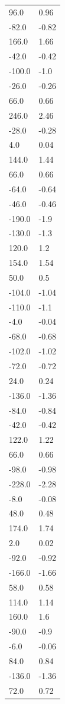 \begin{longtable}{ll}
96.0 & 0.96 \\
-82.0 & -0.82 \\
166.0 & 1.66 \\
-42.0 & -0.42 \\
-100.0 & -1.0 \\
-26.0 & -0.26 \\
66.0 & 0.66 \\
246.0 & 2.46 \\
-28.0 & -0.28 \\
4.0 & 0.04 \\
144.0 & 1.44 \\
66.0 & 0.66 \\
-64.0 & -0.64 \\
-46.0 & -0.46 \\
-190.0 & -1.9 \\
-130.0 & -1.3 \\
120.0 & 1.2 \\
154.0 & 1.54 \\
50.0 & 0.5 \\
-104.0 & -1.04 \\
-110.0 & -1.1 \\
-4.0 & -0.04 \\
-68.0 & -0.68 \\
-102.0 & -1.02 \\
-72.0 & -0.72 \\
24.0 & 0.24 \\
-136.0 & -1.36 \\
-84.0 & -0.84 \\
-42.0 & -0.42 \\
122.0 & 1.22 \\
66.0 & 0.66 \\
-98.0 & -0.98 \\
-228.0 & -2.28 \\
-8.0 & -0.08 \\
48.0 & 0.48 \\
174.0 & 1.74 \\
2.0 & 0.02 \\
-92.0 & -0.92 \\
-166.0 & -1.66 \\
58.0 & 0.58 \\
114.0 & 1.14 \\
160.0 & 1.6 \\
-90.0 & -0.9 \\
-6.0 & -0.06 \\
84.0 & 0.84 \\
-136.0 & -1.36 \\
72.0 & 0.72 \\

\end{longtable}
